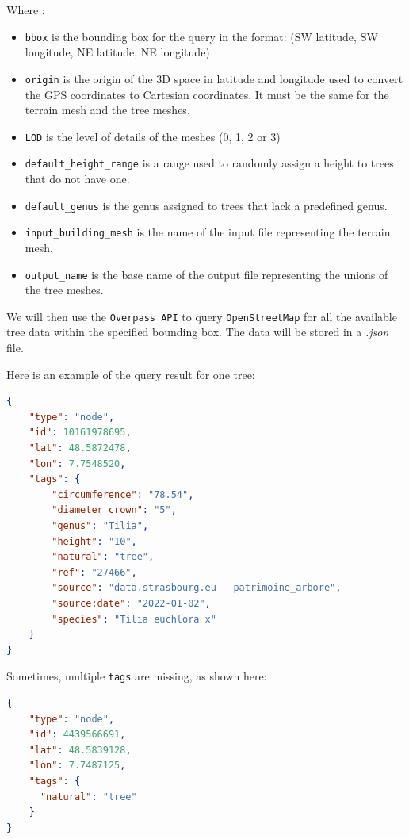 \documentclass[12pt]{article}
\begin{document}
Where :
\begin{itemize}
    \item \texttt{bbox} is the bounding box for the query in the format:
    \subitem (SW latitude, SW longitude, NE latitude, NE longitude)
    \item \texttt{origin} is the origin of the 3D space in latitude and longitude
    used to convert the GPS coordinates to Cartesian coordinates. It must be the
    same for the terrain mesh and the tree meshes.
    \item \texttt{LOD} is the level of details of the meshes (0, 1, 2 or 3)
    \item \texttt{default\_height\_range} is a range used to randomly assign a height to trees that do not have one.
    \item \texttt{default\_genus} is the genus assigned to trees that lack a predefined genus.
    \item \texttt{input\_building\_mesh} is the name of the input file representing the terrain mesh.
    \item \texttt{output\_name} is the base name of the output file representing the unions of the tree meshes.
\end{itemize}

We will then use the \texttt{Overpass API}\cite{overpass} to query
\texttt{OpenStreetMap} for all the available tree data within the specified
bounding box. The data will be stored in a \textit{.json} file.

Here is an example of the query result for one tree:

\begin{lstlisting}[language=json]
{
    "type": "node",
    "id": 10161978695,
    "lat": 48.5872478,
    "lon": 7.7548520,
    "tags": {
        "circumference": "78.54",
        "diameter_crown": "5",
        "genus": "Tilia",
        "height": "10",
        "natural": "tree",
        "ref": "27466",
        "source": "data.strasbourg.eu - patrimoine_arbore",
        "source:date": "2022-01-02",
        "species": "Tilia euchlora x"
    }
}
\end{lstlisting}

Sometimes, multiple \texttt{tags} are missing, as shown here:

\begin{lstlisting}[language=json]
{
    "type": "node",
    "id": 4439566691,
    "lat": 48.5839128,
    "lon": 7.7487125,
    "tags": {
      "natural": "tree"
    }
}
\end{lstlisting}
\end{document}
